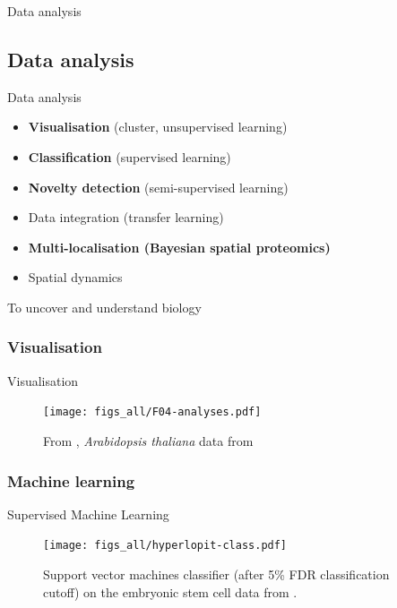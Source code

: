 \begin{frame}{}
  \begin{center}
    \Large{Data analysis}
  \end{center}
\end{frame}


\subsection*{Data analysis}
\label{sec:comp}


\begin{frame}{Data analysis}
  \begin{itemize}
  \item \textbf{Visualisation} (cluster, unsupervised learning)
  \item \textbf{Classification} (supervised learning)
  \item \textbf{Novelty detection} (semi-supervised learning)
  \item Data integration (transfer learning)
  \item \textbf{Multi-localisation (Bayesian spatial proteomics)}
  \item Spatial dynamics
  \end{itemize}
  \centering

  \bigskip

  {\Large To uncover and understand biology}
\end{frame}



\subsubsection*{Visualisation}
\label{sec:viz}

\begin{frame}{Visualisation}
  \begin{figure}
    \centering
    \texttt{[image: figs\_all/F04-analyses.pdf]}
    \caption{From \cite{Gatto:2010}, \textit{Arabidopsis thaliana} data
      from \cite{Dunkley:2006}}
  \end{figure}
\end{frame}

\subsubsection*{Machine learning}
\label{sec:ml}

\begin{frame}{Supervised Machine Learning}
  \begin{figure}[h]
    \centering
    \texttt{[image: figs\_all/hyperlopit-class.pdf]}
    \caption{Support vector machines classifier (after 5\% FDR
      classification cutoff) on the embryonic stem cell data from
      \cite{Christoforou:2016}.}
  \end{figure}
\end{frame}

